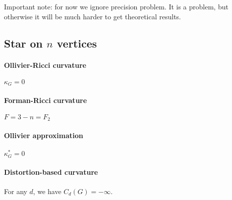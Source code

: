 \documentclass{article}
\begin{document}
Important note: for now we ignore precision problem. It is a problem, but otherwise it will be much harder to get theoretical results.

\subsection{Star on $n$ vertices}

\paragraph{Ollivier-Ricci curvature} $\kappa_G = 0$

\paragraph{Forman-Ricci curvature} $F = 3-n = F_2$

\paragraph{Ollivier approximation} $\kappa_G^* = 0$

\paragraph{Distortion-based curvature} For any $d$, we have $C_d(G) = -\infty$.
\end{document}
